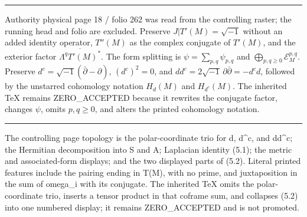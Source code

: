 \documentclass[
  english,
  a3paper,
  a3paper]{extarticle}
\begin{document}
\par

\vspace{0.7mm}\hrule\vspace{1.6mm}

\fontsize{11}{14}\selectfont

Authority physical page 18 / folio 262 was read from the controlling
raster; the running head and folio are excluded. Preserve
\(J|T'(M)=\sqrt{-1}\) without an added identity operator, \(T''(M)\) as
the complex conjugate of \(T'(M)\), and the exterior factor
\(\overline{\Lambda^qT'(M)^*}\). The form splitting is
\(\psi=\sum_{p,q}\psi_{p,q}\) and
\(\bigoplus_{p,q\ge0}\mathcal E_M^{p,q}\). Preserve
\(d^c=\sqrt{-1}(\bar\partial-\partial)\), \((d^c)^2=0\), and
\(dd^c=2\sqrt{-1}\,\partial\bar\partial=-d^cd\), followed by the
unstarred cohomology notation \(H_d(M)\) and \(H_{d^c}(M)\). The
inherited TeX remains ZERO\_ACCEPTED because it rewrites the conjugate
factor, changes \(\psi\), omits \(p,q\ge0\), and alters the printed
cohomology notation.

\clearpage



\par

\vspace{0.7mm}\hrule\vspace{1.6mm}

\fontsize{11}{14}\selectfont

The controlling page topology is the polar-coordinate trio for d,
d\^{}c, and dd\^{}c; the Hermitian decomposition into S and A; Laplacian
identity (5.1); the metric and associated-form displays; and the two
displayed parts of (5.2). Literal printed features include the pairing
ending in T(M), with no prime, and juxtaposition in the sum of omega\_i
with its conjugate. The inherited TeX omits the polar-coordinate trio,
inserts a tensor product in that coframe sum, and collapses (5.2) into
one numbered display; it remains ZERO\_ACCEPTED and is not promoted.

\clearpage



\par
\end{document}
